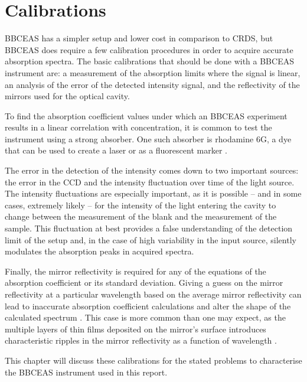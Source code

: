 \chapter{Calibrations}\label{ch:cal}

\acl{BBCEAS} has a simpler setup and lower cost in comparison to \ac{CRDS}, but
\ac{BBCEAS} does require a few calibration procedures in order to acquire
accurate absorption spectra. The basic calibrations that should be done with a
\ac{BBCEAS} instrument are: a measurement of the absorption limits where the
signal is linear, an analysis of the error of the detected intensity signal,
and the reflectivity of the mirrors used for the optical cavity.

To find the absorption coefficient values under which an \ac{BBCEAS} experiment
results in a linear correlation with concentration, it is common to test the
instrument using a strong absorber. One such absorber is rhodamine 6G, a dye
that can be used to create a laser \cite{Pappalardo:1970hi} or as a fluorescent
marker \cite{Gear:1974tf}.

The error in the detection of the intensity comes down to two important
sources: the error in the \ac{CCD} and the intensity fluctuation over time of
the light source. The intensity fluctuations are especially important, as it is
possible -- and in some cases, extremely likely -- for the intensity of the
light entering the cavity to change between the measurement of the blank and
the measurement of the sample. This fluctuation at best provides a false
understanding of the detection limit of the setup and, in the case of high
variability in the input source, silently modulates the absorption peaks in
acquired spectra.

Finally, the mirror reflectivity is required for any of the equations of the
absorption coefficient or its standard deviation. Giving a guess on the mirror
reflectivity at a particular wavelength based on the average mirror
reflectivity can lead to inaccurate absorption coefficient calculations and
alter the shape of the calculated spectrum \cite{Berden:2009wk}. This case is
more common than one may expect, as the multiple layers of thin films deposited
on the mirror's surface introduces characteristic ripples in the mirror
reflectivity as a function of wavelength \cite{Islam:2007ea}.

This chapter will discuss these calibrations for the stated problems to
characterise the \ac{BBCEAS} instrument used in this report.



